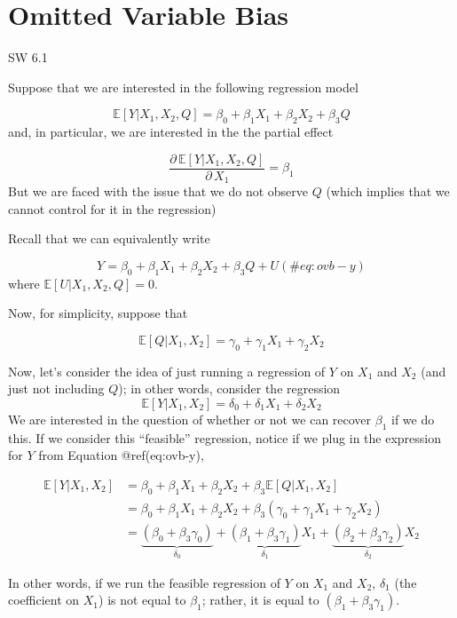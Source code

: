 \documentclass[
  letterpaper,
  DIV=11,
  numbers=noendperiod]{scrreprt}
\begin{document}
\section{Omitted Variable Bias}\label{omitted-variable-bias}

SW 6.1

Suppose that we are interested in the following regression model

\[
  \mathbb{E}[Y|X_1, X_2, Q] = \beta_0 + \beta_1 X_1 + \beta_2 X_2 + \beta_3 Q
\] and, in particular, we are interested in the the partial effect

\[
  \frac{ \partial \, \mathbb{E}[Y|X_1,X_2,Q]}{\partial \, X_1} = \beta_1
\] But we are faced with the issue that we do not observe \(Q\) (which
implies that we cannot control for it in the regression)

Recall that we can equivalently write

\[
  Y = \beta_0 + \beta_1 X_1 + \beta_2 X_2 + \beta_3 Q + U (\#eq:ovb-y)
\] where \(\mathbb{E}[U|X_1,X_2,Q]=0\).

Now, for simplicity, suppose that

\[
  \mathbb{E}[Q | X_1, X_2] = \gamma_0 + \gamma_1 X_1 + \gamma_2 X_2
\]

Now, let's consider the idea of just running a regression of \(Y\) on
\(X_1\) and \(X_2\) (and just not including \(Q\)); in other words,
consider the regression \[
  \mathbb{E}[Y|X_1,X_2] = \delta_0 + \delta_1 X_1 + \delta_2 X_2
\] We are interested in the question of whether or not we can recover
\(\beta_1\) if we do this. If we consider this ``feasible'' regression,
notice if we plug in the expression for \(Y\) from Equation
@ref(eq:ovb-y),

\[
  \begin{aligned}
  \mathbb{E}[Y|X_1,X_2] &= \beta_0 + \beta_1 X_1 + \beta_2 X_2 + \beta_3 \mathbb{E}[Q|X_1,X_2] \\
  &= \beta_0 + \beta_1 X_1 + \beta_2 X_2 + \beta_3 (\gamma_0 + \gamma_1 X_1 + \gamma_2 X_2) \\
  &= \underbrace{(\beta_0 + \beta_3 \gamma_0)}_{\delta_0} + \underbrace{(\beta_1 + \beta_3 \gamma_1)}_{\delta_1} X_1 + \underbrace{(\beta_2 + \beta_3 \gamma_2)}_{\delta_2} X_2
  \end{aligned}
\]

In other words, if we run the feasible regression of \(Y\) on \(X_1\)
and \(X_2\), \(\delta_1\) (the coefficient on \(X_1\)) is not equal to
\(\beta_1\); rather, it is equal to \((\beta_1 + \beta_3 \gamma_1)\).
\end{document}
